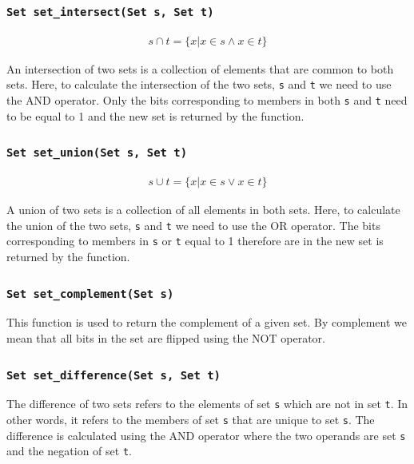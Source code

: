 \documentclass[11pt]{article}
\begin{document}
\subsubsection{\texttt{Set set\_intersect(Set s, Set t)}}

\begin{align*}
  s \cap t = \{x | x \in s \land x \in  t\}
\end{align*}

An intersection of two sets is a collection of elements that are common
to both sets. Here, to calculate the intersection of the two sets,
\texttt{s} and \texttt{t} we need to use the AND operator. Only the bits
corresponding to members in both \texttt{s} and \texttt{t} need to be
equal to 1 and the new set is returned by the function.

\subsubsection{\texttt{Set set\_union(Set s, Set t)}}

\begin{align*}
  s \cup t = \{x | x \in s \lor x \in  t\}
\end{align*}

A union of two sets is a collection of all elements in both sets. Here,
to calculate the union of the two sets, \texttt{s} and \texttt{t} we
need to use the OR operator. The bits corresponding to members in
\texttt{s} or \texttt{t} equal to 1 therefore are in the new set is
returned by the function.

\subsubsection{\texttt{Set set\_complement(Set s)}}

This function is used to return the complement of a given set. By
complement we mean that all bits in the set are flipped using the NOT
operator.

\subsubsection{\texttt{Set set\_difference(Set s, Set t)}}

The difference of two sets refers to the elements of set \texttt{s}
which are not in set \texttt{t}. In other words, it refers to the
members of set \texttt{s} that are unique to set \texttt{s}. The
difference is calculated using the AND operator where the two operands
are set \texttt{s} and the negation of set \texttt{t}.
\end{document}

